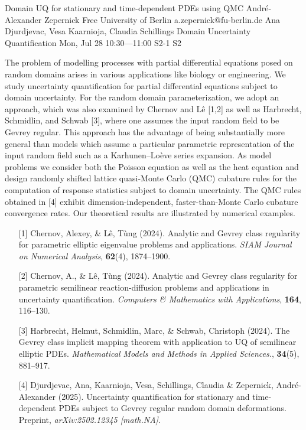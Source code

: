 \begin{talk}
  {Domain UQ for stationary and time-dependent PDEs using QMC}%
  {Andr\'e-Alexander Zepernick}%
  {Free University of Berlin}%
  {a.zepernick@fu-berlin.de}%
  {Ana Djurdjevac, Vesa Kaarnioja, Claudia Schillings}%
  {Domain Uncertainty Quantification}%
  {Mon, Jul 28 10:30---11:00}%
  {S2-1}%
  {S2}%

The problem of modelling processes with partial differential equations posed on random domains arises in various applications like biology or engineering. We study uncertainty quantification for partial differential equations subject to domain uncertainty. For the random domain parameterization, we adopt an approach, which was also examined by Chernov and L\^{e} [1,2] as well as Harbrecht, Schmidlin, and Schwab [3], where one assumes the input random field to be Gevrey regular. This approach has the advantage of being substantially more general than models which assume a particular parametric representation of the input random field such as a Karhunen--Lo\`eve series expansion. As model problems we consider both the Poisson equation as well as the heat equation and design randomly shifted lattice quasi-Monte Carlo (QMC) cubature rules for the computation of response statistics subject to domain uncertainty. The QMC rules obtained in [4] exhibit dimension-independent, faster-than-Monte Carlo cubature convergence rates. Our theoretical results are illustrated by numerical examples.
\begin{enumerate}
    \item[{[1]}] Chernov, Alexey, \& L\^{e}, T\`ung (2024). Analytic and Gevrey class regularity for parametric elliptic eigenvalue problems and applications. \emph{SIAM Journal on Numerical Analysis}, \textbf{62}(4), 1874--1900.
    \item[{[2]}] Chernov, A., \& L\^{e}, T\`ung (2024). Analytic and Gevrey class regularity for parametric semilinear reaction-diffusion problems and applications in uncertainty quantification. \emph{Computers \& Mathematics with Applications}, \textbf{164}, 116--130.
    \item[{[3]}] Harbrecht, Helmut, Schmidlin, Marc, \& Schwab, Christoph (2024). The Gevrey class implicit mapping theorem with application to UQ of semilinear elliptic PDEs. \emph{Mathematical Models and Methods in Applied Sciences.}, \textbf{34}(5), 881--917.
    \item[{[4]}] Djurdjevac, Ana, Kaarnioja, Vesa, Schillings, Claudia \& Zepernick, Andr\'e-Alexander (2025). Uncertainty quantification for stationary and time-dependent PDEs subject to Gevrey regular random domain deformations. Preprint, \emph{arXiv:2502.12345 [math.NA]}.
\end{enumerate}

\medskip

\end{talk}

